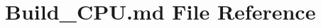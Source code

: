 \hypertarget{Build__CPU_8md}{\section{Build\-\_\-\-C\-P\-U.\-md File Reference}
\label{Build__CPU_8md}
}
